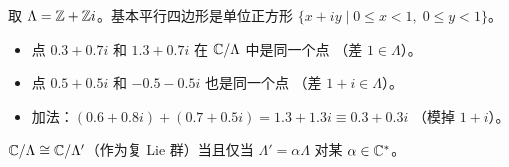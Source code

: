\begin{example}[格 $\Z + \Z i$ 对应的环面]
\label{ex:square-torus}
取 $\Lambda = \mathbb{Z} + \mathbb{Z} i$。基本平行四边形是单位正方形
$\{x + iy \mid 0 \leq x < 1,\; 0 \leq y < 1\}$。
\begin{itemize}
  \item 点 $0.3 + 0.7i$ 和 $1.3 + 0.7i$ 在 $\mathbb{C}/\Lambda$ 中是同一个点
    （差 $1 \in \Lambda$）。
  \item 点 $0.5 + 0.5i$ 和 $-0.5 - 0.5i$ 也是同一个点
    （差 $1 + i \in \Lambda$）。
  \item 加法：$(0.6 + 0.8i) + (0.7 + 0.5i) = 1.3 + 1.3i \equiv 0.3 + 0.3i$
    （模掉 $1 + i$）。
\end{itemize}
\end{example}

\begin{proposition}[复环面的同构分类]
\label{prop:torus-isomorphism}
$\mathbb{C}/\Lambda \cong \mathbb{C}/\Lambda'$（作为复 Lie 群）当且仅当
$\Lambda' = \alpha\Lambda$ 对某 $\alpha \in \mathbb{C}^*$。
\end{proposition}

